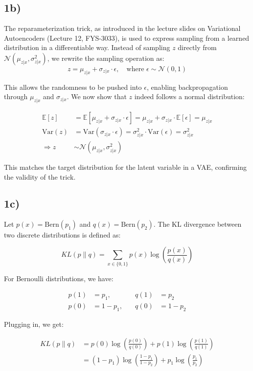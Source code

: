 \documentclass[10pt]{article}
\begin{document}
\subsection*{1b)}
The reparameterization trick, as introduced in the lecture slides on Variational Autoencoders (Lecture 12, FYS-3033), is used to express sampling from a learned distribution in a differentiable way. Instead of sampling $z$ directly from $\mathcal{N}(\mu_{z|x}, \sigma_{z|x}^2)$, we rewrite the sampling operation as:
\[
z = \mu_{z|x} + \sigma_{z|x} \cdot \epsilon, \quad \text{where } \epsilon \sim \mathcal{N}(0, 1)
\]

\noindent This allows the randomness to be pushed into $\epsilon$, enabling backpropagation through $\mu_{z|x}$ and $\sigma_{z|x}$. We now show that $z$ indeed follows a normal distribution:

\begin{align*}
\mathbb{E}[z] &= \mathbb{E}[\mu_{z|x} + \sigma_{z|x} \cdot \epsilon] = \mu_{z|x} + \sigma_{z|x} \cdot \mathbb{E}[\epsilon] = \mu_{z|x} \\
\text{Var}(z) &= \text{Var}(\sigma_{z|x} \cdot \epsilon) = \sigma_{z|x}^2 \cdot \text{Var}(\epsilon) = \sigma_{z|x}^2 \\
\Rightarrow z &\sim \mathcal{N}(\mu_{z|x}, \sigma_{z|x}^2)
\end{align*}

\noindent This matches the target distribution for the latent variable in a VAE, confirming the validity of the trick.
\subsection*{1c)}

Let \( p(x) = \text{Bern}(p_1) \) and \( q(x) = \text{Bern}(p_2) \). The KL divergence between two discrete distributions is defined as:

\[
KL(p \parallel q) = \sum_{x \in \{0,1\}} p(x) \log \left( \frac{p(x)}{q(x)} \right)
\]

For Bernoulli distributions, we have:

\begin{align*}
p(1) &= p_1, &\quad q(1) &= p_2 \\
p(0) &= 1 - p_1, &\quad q(0) &= 1 - p_2
\end{align*}

\noindent Plugging in, we get:

\begin{align*}
KL(p \parallel q) &= p(0) \log \left( \frac{p(0)}{q(0)} \right) + p(1) \log \left( \frac{p(1)}{q(1)} \right) \\
&= (1 - p_1) \log \left( \frac{1 - p_1}{1 - p_2} \right) + p_1 \log \left( \frac{p_1}{p_2} \right)
\end{align*}
\end{document}
